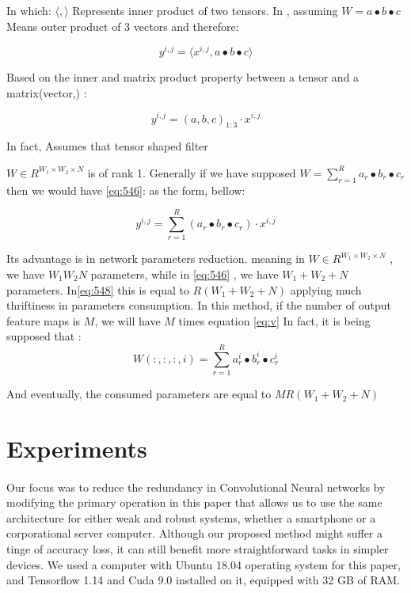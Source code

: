 \documentclass{report}
\begin{document}
In which:
$ \big\langle , \big\rangle $
Represents inner product of two tensors. In 
\cite{danish},
assuming 
$ W = a\bullet b \bullet c  $
Means outer product of 3 vectors and therefore:

\begin{equation} \label{eq:545}
y^{i,j} =  \big\langle x^{i,j},a \bullet b \bullet c \big\rangle
\end{equation} 

Based on the inner and matrix product property between a tensor and a matrix(vector,)
\cite{rezghi}:

\begin{equation} \label{eq:546}
y^{i,j} = (a,b,c)_{1:3}\cdot x^{i,j}
\end{equation} 

In fact,
\cite{danish}
Assumes that tensor shaped filter

$ W \in R^{W_{1}\times W_{2}\times N} $
is of rank 1. Generally if we have supposed
$W = \sum^{R}_{r=1}a_{r}\bullet b_{r} \bullet c_{r}$
then we would have
\ref{eq:546}:
as the form, bellow:

\begin{equation} \label{eq:548}
y^{i,j} = \sum^{R}_{r=1}(a_{r}\bullet b_{r} \bullet c_{r})\cdot x^{i,j}
\end{equation} 

Its advantage is in network parameters reduction. meaning in
$ W \in R^{W_{1}\times W_{2}\times N} $
, we have 
$ W_{1}W_{2}N $
parameters, while in 
\ref{eq:546}
, we have 
$ W_{1}+ W_{2}+ N $
parameters. In\ref{eq:548}
this is equal to
$ R(W_{1}+ W_{2} + N) $
applying much thriftiness in parameters consumption. In this method, if the number of output feature maps is $ M $,
we will have 
$ M $
times equation
\ref{eq:v}
In fact, it is being supposed that :
\begin{equation} \label{eq:549}
W(:,:,:,i) = \sum^{R}_{r=1}a_{r}^{i} \bullet b_{r}^{i} \bullet c_{r}^{i}
\end{equation} 

And eventually, the consumed parameters are equal to
$MR(W_{1}+W_{2}+ N)$



\section{Experiments}

\paragraph*{}
Our focus was to reduce the redundancy in Convolutional Neural networks by modifying the primary operation in this paper that allows us to use the same architecture for either weak and robust systems, whether a smartphone or a corporational server computer. Although our proposed method might suffer a tinge of accuracy loss, it can still benefit more straightforward tasks in simpler devices. We used a computer with Ubuntu 18.04 operating system for this paper, and Tensorflow 1.14 and Cuda 9.0 installed on it, equipped with 32 GB of RAM.
\end{document}
